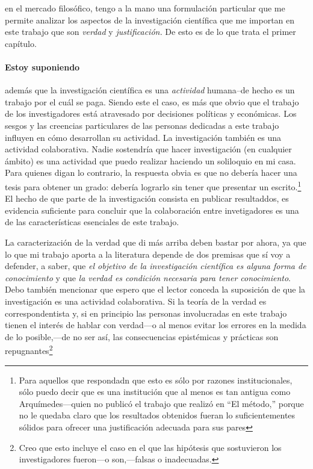 en el mercado filosófico, tengo a la mano una formulación particular
que me permite analizar los aspectos de la investigación científica que me importan
en este trabajo que son \textit{verdad} y \textit{justificación.} De esto es de lo
que trata el primer capítulo.

\paragraph{Estoy suponiendo} además que la investigación científica es una
\textit{actividad} humana--de hecho es un trabajo por el cuál se paga.
Siendo este el caso, es más que obvio que el trabajo de los investigadores
está atravesado por decisiones políticas y económicas. Los sesgos y
las creencias particulares de las personas dedicadas a este trabajo
influyen en cómo desarrollan su actividad. La investigación también es una
actividad colaborativa. Nadie sostendría que hacer investigación (en
cualquier ámbito) es una actividad que puedo realizar haciendo un
soliloquio en mi casa. Para quienes digan lo contrario, la respuesta obvia
es que no debería hacer una tesis para obtener un grado: debería lograrlo
sin tener que presentar un escrito.\footnote{Para aquellos que
respondadn que esto es sólo por razones institucionales, sólo puedo decir
que es una institución que al menos es tan antigua como Arquímedes---quien
no publicó el trabajo que realizó en ``El método,'' porque no le quedaba
claro que los resultados obtenidos fueran lo suficientementes sólidos para
ofrecer una justificación adecuada para sus pares
} El hecho de que parte de la investigación
consista en publicar resultaddos, es evidencia suficiente para concluir que
la colaboración entre invetigadores es una de las características
esenciales de este trabajo.

La caracterización de la verdad que di más arriba deben bastar por ahora, ya que lo que mi trabajo aporta a la literatura depende de dos premisas que sí voy a defender, a saber, que \textit{el objetivo de la investigación científica es alguna forma de conocimiento} y que \textit{la verdad es condición necesaria para tener conocimiento}. Debo también mencionar que espero que el lector conceda la suposición de que la investigación es una actividad colaborativa. Si la teoría de la verdad es correspondentista y, si en principio las personas involucradas en este trabajo tienen el interés de hablar con verdad---o al menos evitar los errores en la medida de lo posible,---de no ser así, las consecuencias epistémicas y prácticas son repugnantes\footnote{Creo que esto incluye el caso en el que las hipótesis que sostuvieron los investigadores fueron---o son,---falsas o inadecuadas.}

